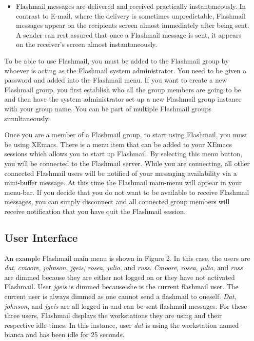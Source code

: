 \begin{itemize}
\item Flashmail messages are delivered and received practically
  instantaneously. In contrast to E-mail, where the delivery is sometimes
  unpredictable, Flashmail messages appear on the recipients screen almost
  immediately after being sent.  A sender can rest assured that once a
  Flashmail message is sent, it appears on the receiver's screen almost
  instantaneously. 

\end{itemize}

To be able to use Flashmail, you must be added to the Flashmail group by
whoever is acting as the Flashmail system administrator.  You need to be
given a password and added into the Flashmail menu.  If you want to create
a new Flashmail group, you first establish who all the group members are
going to be and then have the system administrator set up a new Flashmail
group instance with your group name. You can be part of multiple Flashmail
groups simultaneously.

Once you are a member of a Flashmail group, to start using Flashmail, you
must be using XEmacs.  There is a menu item that can be added to your
XEmacs sessions which allows you to start up Flashmail.  By selecting this
menu button, you will be connected to the Flashmail server.  While you are
connecting, all other connected Flashmail users will be notified of your
messaging availability via a mini-buffer message.  At this time the
Flashmail main-menu will appear in your menu-bar. If you decide that you do
not want to be available to receive Flashmail messages, you can simply
disconnect and all connected group members will receive notification that
you have quit the Flashmail session.

\newpage
\subsection{User Interface}
An example Flashmail main menu is shown in Figure 2.  In this case, the
users are \textit{dat}, \textit{cmoore}, \textit{johnson}, \textit{jgeis},
\textit{rosea}, \textit{julio}, and \textit{russ}. \textit{Cmoore}, \textit{rosea}, \textit{julio}, and
\textit{russ} are dimmed because they are either not logged on or they have
not activated Flashmail.  User \textit{jgeis} is dimmed because she is the
current flashmail user. The current user is always dimmed as one cannot
send a flashmail to oneself. \textit{Dat}, \textit{johnson}, and
\textit{jgeis} are all logged in and can be sent flashmail messages.  For
these three users, Flashmail displays the workstations they are using and
their respective idle-times.  In this instance, user \textit{dat} is using
the workstation named bianca and has been idle for 25 seconds.

